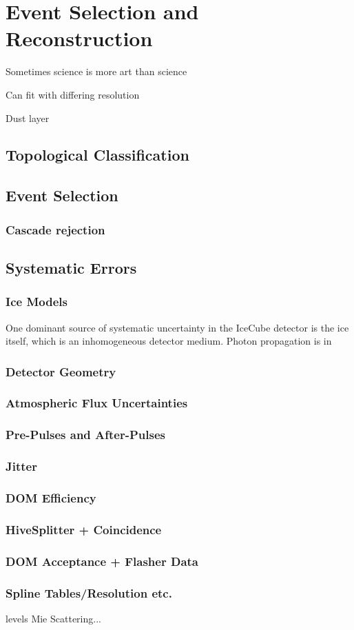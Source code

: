 \setchapterpreamble[u]{\margintoc}
\chapter{Event Selection and Reconstruction}
\begin{fquote} Sometimes science is more art than science
\end{fquote}

Can fit with differing resolution

Dust layer
\section{Topological Classification}
\section{Event Selection}
\subsection{Cascade rejection}
\section{Systematic Errors}
\subsection{Ice Models}
One dominant source of systematic uncertainty in the IceCube detector is the ice itself, which is an inhomogeneous detector medium. Photon propagation is in
\subsection{Detector Geometry}
\subsection{Atmospheric Flux Uncertainties}
\subsection{Pre-Pulses and After-Pulses}
\subsection{Jitter}
\subsection{DOM Efficiency}
\subsection{HiveSplitter + Coincidence}
\subsection{DOM Acceptance + Flasher Data}
\subsection{Spline Tables/Resolution etc.}
levels
Mie Scattering...